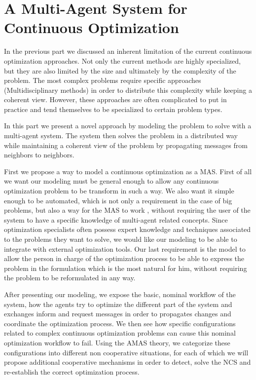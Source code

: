 \part{A Multi-Agent System for Continuous Optimization}\label{MAS4Optim_part}

In the previous part we discussed an inherent limitation of the current continuous optimization approaches. Not only the current methods are highly specialized, but they are also limited by the size and ultimately by the complexity of the problem. The most complex problems require specific approaches (Multidisciplinary methods) in order to distribute this complexity while keeping a coherent view. However, these approaches are often complicated to put in practice and tend themselves to be specialized to certain problem types.

In this part we present a novel approach by modeling the problem to solve with a multi-agent system. The system then solves the problem in a distributed way while maintaining a coherent view of the problem by propagating messages from neighbors to neighbors. 

First we propose a way to model a continuous optimization  as a MAS. First of all we want our modeling must be general enough to allow any continuous optimization problem to be transform in such a way. We also want it simple enough to be automated, which is not only a requirement in the case of big problems, but also a way for the MAS to work , without requiring the user of the system to have a specific knowledge of multi-agent related concepts. Since optimization specialists often possess expert  knowledge and techniques associated to the problems they want to solve, we would like our modeling to be able to integrate with external optimization tools. Our last requirement is the model to allow the person in charge of the optimization process to be able to express the problem in the formulation which is the most natural for him, without requiring the problem to be reformulated in any way.

After presenting our modeling, we expose the basic, nominal workflow of the system, how the agents try to optimize the different part of the system and exchanges inform and request messages in order to propagates changes and coordinate the optimization process. We then see how specific configurations related to complex continuous optimization problems can cause this nominal optimization workflow to fail. Using the AMAS theory, we categorize these configurations into different non cooperative situations, for each of which we will propose additional cooperative mechanisms in  order to detect, solve the NCS and re-establish the correct optimization process.

